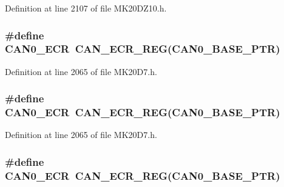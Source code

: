 Definition at line 2107 of file M\+K20\+D\+Z10.\+h.

\subsubsection[{\texorpdfstring{C\+A\+N0\+\_\+\+E\+CR}{CAN0_ECR}}]{\setlength{\rightskip}{0pt plus 5cm}\#define C\+A\+N0\+\_\+\+E\+CR~{\bf C\+A\+N\+\_\+\+E\+C\+R\+\_\+\+R\+EG}({\bf C\+A\+N0\+\_\+\+B\+A\+S\+E\+\_\+\+P\+TR})}\hypertarget{group___c_a_n___register___accessor___macros_gae5c1b27d66a19078c1a9bb64376d2b3f}{}\label{group___c_a_n___register___accessor___macros_gae5c1b27d66a19078c1a9bb64376d2b3f}


Definition at line 2065 of file M\+K20\+D7.\+h.

\subsubsection[{\texorpdfstring{C\+A\+N0\+\_\+\+E\+CR}{CAN0_ECR}}]{\setlength{\rightskip}{0pt plus 5cm}\#define C\+A\+N0\+\_\+\+E\+CR~{\bf C\+A\+N\+\_\+\+E\+C\+R\+\_\+\+R\+EG}({\bf C\+A\+N0\+\_\+\+B\+A\+S\+E\+\_\+\+P\+TR})}\hypertarget{group___c_a_n___register___accessor___macros_gae5c1b27d66a19078c1a9bb64376d2b3f}{}\label{group___c_a_n___register___accessor___macros_gae5c1b27d66a19078c1a9bb64376d2b3f}


Definition at line 2065 of file M\+K20\+D7.\+h.

\subsubsection[{\texorpdfstring{C\+A\+N0\+\_\+\+E\+CR}{CAN0_ECR}}]{\setlength{\rightskip}{0pt plus 5cm}\#define C\+A\+N0\+\_\+\+E\+CR~{\bf C\+A\+N\+\_\+\+E\+C\+R\+\_\+\+R\+EG}({\bf C\+A\+N0\+\_\+\+B\+A\+S\+E\+\_\+\+P\+TR})}\hypertarget{group___c_a_n___register___accessor___macros_gae5c1b27d66a19078c1a9bb64376d2b3f}{}\label{group___c_a_n___register___accessor___macros_gae5c1b27d66a19078c1a9bb64376d2b3f}


